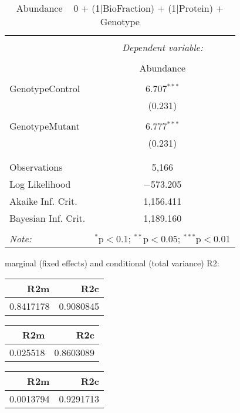 \documentclass[11pt]{report}
\begin{document}
\begin{table}[!htbp] \centering 
  \caption{Abundance ~ 0 + (1|BioFraction) + (1|Protein) + Genotype} 
  \label{} 
\begin{tabular}{@{\extracolsep{5pt}}lc} 
\\[-1.8ex]\hline 
\hline \\[-1.8ex] 
 & \multicolumn{1}{c}{\textit{Dependent variable:}} \\ 
\cline{2-2} 
\\[-1.8ex] & Abundance \\ 
\hline \\[-1.8ex] 
 GenotypeControl & 6.707$^{***}$ \\ 
  & (0.231) \\ 
  & \\ 
 GenotypeMutant & 6.777$^{***}$ \\ 
  & (0.231) \\ 
  & \\ 
\hline \\[-1.8ex] 
Observations & 5,166 \\ 
Log Likelihood & $-$573.205 \\ 
Akaike Inf. Crit. & 1,156.411 \\ 
Bayesian Inf. Crit. & 1,189.160 \\ 
\hline 
\hline \\[-1.8ex] 
\textit{Note:}  & \multicolumn{1}{r}{$^{*}$p$<$0.1; $^{**}$p$<$0.05; $^{***}$p$<$0.01} \\ 
\end{tabular} 
\end{table} 
marginal (fixed effects) and conditional (total variance) R2:

\begin{tabular}{r|r}
\hline
R2m & R2c\\
\hline
0.8417178 & 0.9080845\\
\hline
\end{tabular}

\begin{tabular}{r|r}
\hline
R2m & R2c\\
\hline
0.025518 & 0.8603089\\
\hline
\end{tabular}

\begin{tabular}{r|r}
\hline
R2m & R2c\\
\hline
0.0013794 & 0.9291713\\
\hline
\end{tabular}
\end{document}
